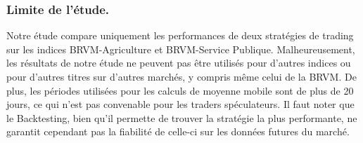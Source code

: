 \subsubsection{Limite de l'étude. }
\par{Notre étude compare uniquement les performances de deux stratégies de trading sur les indices BRVM-Agriculture et 
BRVM-Service Publique. Malheureusement, les résultats de notre étude ne peuvent pas être utilisés pour d'autres 
indices ou pour d'autres titres sur d'autres marchés, y compris même celui de la BRVM. De plus, les périodes utilisées
pour les calculs de moyenne mobile sont de plus de 20 jours, ce qui n'est pas convenable pour les traders spéculateurs.
Il faut noter que le Backtesting, bien qu'il permette de trouver la stratégie la plus performante, ne garantit cependant pas
la fiabilité de celle-ci sur les données futures du marché.}

